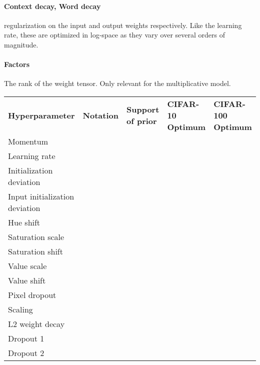 \documentclass{article}
\begin{document}
\paragraph{Context decay, Word decay}  regularization on the input and output weights respectively. Like the learning rate, these are optimized in log-space as they vary over several orders of magnitude.

\paragraph{Factors} The rank of the weight tensor. Only relevant for the multiplicative model.

\begin{table*}[t]
  \centering
  \begin{tabular}[b]{lllll}
    \toprule
    {\bf Hyperparameter} & {\bf Notation} & {\bf Support of prior} & {\bf CIFAR-10 Optimum} & {\bf CIFAR-100 Optimum}\\\cmidrule(r){1-5}Momentum &  &  &  &  \\
    Learning rate &  &  &  &  \\
    Initialization deviation &  &  &  &  \\
    Input initialization deviation &  &  &  &  \\
    Hue shift &  &  &  &  \\
    Saturation scale &  &  &  &  \\
    Saturation shift &  &  &  &  \\
    Value scale &  &  &  &  \\
    Value shift &  &  &  &  \\
    Pixel dropout &  &  &  &  \\
    Scaling &  &  &  &  \\
    L2 weight decay &  &  &  &  \\
    Dropout 1 &  &  &  &  \\
    Dropout 2 &  &  &  &  \\
   \bottomrule \end{tabular}
  \captionsetup[table]{position=bottom}
  \label{tab:priors}
\end{table*}
\end{document}
